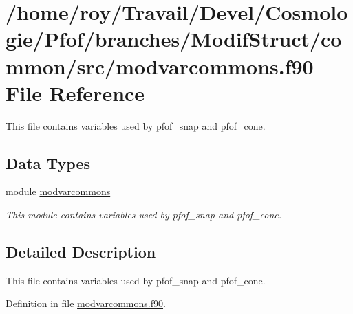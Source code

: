 \hypertarget{modvarcommons_8f90}{\section{/home/roy/\-Travail/\-Devel/\-Cosmologie/\-Pfof/branches/\-Modif\-Struct/common/src/modvarcommons.f90 File Reference}
\label{modvarcommons_8f90}
}


This file contains variables used by pfof\-\_\-snap and pfof\-\_\-cone.  


\subsection*{Data Types}
\begin{DoxyCompactItemize}
\item 
module \hyperlink{classmodvarcommons}{modvarcommons}
\begin{DoxyCompactList}\small\item\em This module contains variables used by pfof\-\_\-snap and pfof\-\_\-cone. \end{DoxyCompactList}\end{DoxyCompactItemize}


\subsection{Detailed Description}
This file contains variables used by pfof\-\_\-snap and pfof\-\_\-cone. 

Definition in file \hyperlink{modvarcommons_8f90_source}{modvarcommons.\-f90}.

